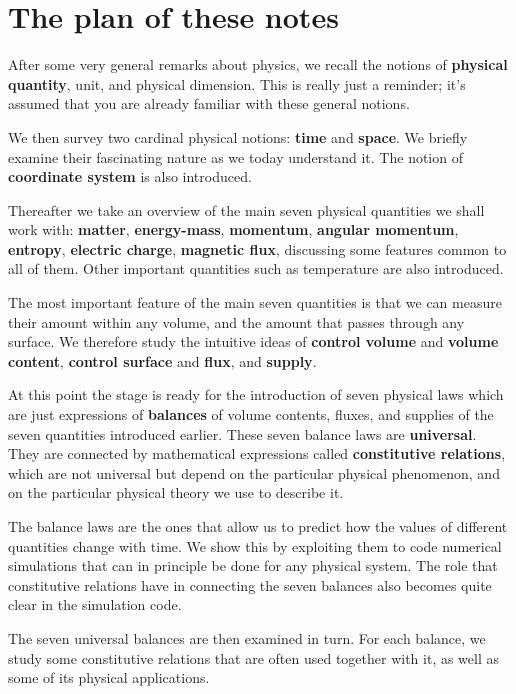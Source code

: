 \documentclass[a4paper,12pt,%
onecolumn,oneside,%
british%
]{memoir}
\renewcommand*{\|}[1][]{\nonscript\:#1\vert\nonscript\:\mathopen{}}
\begin{document}
\section{The plan of these notes}

After some very general remarks about physics, we recall the notions of \textbf{physical quantity}, unit, and physical dimension. This is really just a reminder; it's assumed that you are already familiar with these general notions.

We then survey two cardinal physical notions: \textbf{time} and \textbf{space}. We briefly examine their fascinating nature as we today understand it. The notion of \textbf{coordinate system} is also introduced.

Thereafter we take an overview of the main seven physical quantities we shall work with: \textbf{matter}, \textbf{energy-mass}, \textbf{momentum}, \textbf{angular momentum}, \textbf{entropy},  \textbf{electric charge}, \textbf{magnetic flux}, discussing some features common to all of them. Other important quantities such as temperature are also introduced.

The most important feature of the main seven quantities is that we can measure their amount within any volume, and the amount that passes through any surface. We therefore study the intuitive ideas of \textbf{control volume} and \textbf{volume content}, \textbf{control surface} and \textbf{flux}, and \textbf{supply}.

At this point the stage is ready for the introduction of seven physical laws which are just expressions of \textbf{balances} of volume contents, fluxes, and supplies of the seven quantities introduced earlier. These seven balance laws are \textbf{universal}. They are connected by mathematical expressions called \textbf{constitutive relations}, which are not universal but depend on the particular physical phenomenon, and on the particular physical theory we use to describe it.

The balance laws are the ones that allow us to predict how the values of different quantities change with time. We show this by exploiting them to code numerical simulations that can in principle be done for any physical system. The role that constitutive relations have in connecting the seven balances also becomes quite clear in the simulation code.

The seven universal balances are then examined in turn. For each balance, we study some constitutive relations that are often used together with it, as well as some of its physical applications.
\end{document}
